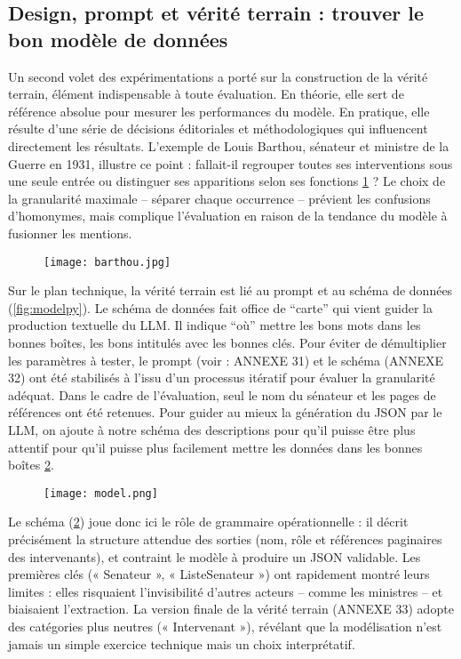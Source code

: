 \subsection{Design, prompt et vérité terrain : trouver le bon modèle de données}

Un second volet des expérimentations a porté sur la construction de la vérité terrain, élément indispensable à toute évaluation. En théorie, elle sert de référence absolue pour mesurer les performances du modèle. En pratique, elle résulte d’une série de décisions éditoriales et méthodologiques qui influencent directement les résultats. L’exemple de Louis Barthou, sénateur et ministre de la Guerre en 1931, illustre ce point : fallait-il regrouper toutes ses interventions sous une seule entrée ou distinguer ses apparitions selon ses fonctions \ref{fig:barthou}  ? Le choix de la granularité maximale – séparer chaque occurrence – prévient les confusions d’homonymes, mais complique l’évaluation en raison de la tendance du modèle à fusionner les mentions.

\begin{figure}[htbp]
\centering
\texttt{[image: barthou.jpg]}
\caption{}
\label{fig:barthou}
\end{figure}

Sur le plan technique, la vérité terrain est lié au prompt et au schéma de données (\ref{fig:modelpy}). Le schéma de données fait office de \enquote{carte} qui vient guider la production textuelle du LLM. Il indique \enquote{où} mettre les bons mots dans les bonnes boîtes, les bons intitulés avec les bonnes clés. Pour éviter de démultiplier les paramètres à tester, le prompt (voir : ANNEXE 31) et le schéma (ANNEXE 32) ont été stabilisés à l'issu d'un processus itératif pour évaluer la granularité adéquat. Dans le cadre de l'évaluation, seul le nom du sénateur et les pages de références ont été retenues. Pour guider au mieux la génération du JSON par le LLM, on ajoute à notre schéma des descriptions pour qu'il puisse être plus attentif pour qu'il puisse plus facilement mettre les données dans les bonnes boîtes \ref{fig:model}.

\begin{figure}[htbp]
\centering
\texttt{[image: model.png]}
\caption{}
\label{fig:model}
\end{figure}

Le schéma (\ref{fig:model}) joue donc ici le rôle de grammaire opérationnelle : il décrit précisément la structure attendue des sorties (nom, rôle et références paginaires des intervenants), et contraint le modèle à produire un JSON validable. Les premières clés (« Senateur », « ListeSenateur ») ont rapidement montré leurs limites : elles risquaient l'invisibilité d’autres acteurs -- comme les ministres -- et biaisaient l’extraction. La version finale de la vérité terrain (ANNEXE 33) adopte des catégories plus neutres (« Intervenant »), révélant que la modélisation n’est jamais un simple exercice technique mais un choix interprétatif.

